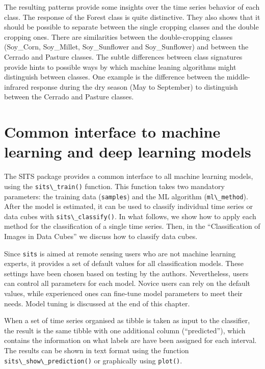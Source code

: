\documentclass[
  11pt,
]{report}
\newcommand{\passthrough}[1]{#1}
\begin{document}
The resulting patterns provide some insights over the time series
behavior of each class. The response of the Forest class is quite
distinctive. They also shows that it should be possible to separate
between the single cropping classes and the double cropping ones. There
are similarities between the double-cropping classes (Soy\_Corn,
Soy\_Millet, Soy\_Sunflower and Soy\_Sunflower) and between the Cerrado
and Pasture classes. The subtle differences between class signatures
provide hints to possible ways by which machine leaning algorithms might
distinguish between classes. One example is the difference between the
middle-infrared response during the dry season (May to September) to
distinguish between the Cerrado and Pasture classes.

\hypertarget{common-interface-to-machine-learning-and-deep-learning-models}{%
\section*{Common interface to machine learning and deep learning
models}\label{common-interface-to-machine-learning-and-deep-learning-models}}

The SITS package provides a common interface to all machine learning
models, using the \passthrough{\lstinline!sits\_train()!} function. This
function takes two mandatory parameters: the training data
(\passthrough{\lstinline!samples!}) and the ML algorithm
(\passthrough{\lstinline!ml\_method!}). After the model is estimated, it
can be used to classify individual time series or data cubes with
\passthrough{\lstinline!sits\_classify()!}. In what follows, we show how
to apply each method for the classification of a single time series.
Then, in the ``Classification of Images in Data Cubes'' we discuss how
to classify data cubes.

Since \passthrough{\lstinline!sits!} is aimed at remote sensing users
who are not machine learning experts, it provides a set of default
values for all classification models. These settings have been chosen
based on testing by the authors. Nevertheless, users can control all
parameters for each model. Novice users can rely on the default values,
while experienced ones can fine-tune model parameters to meet their
needs. Model tuning is discussed at the end of this chapter.

When a set of time series organised as tibble is taken as input to the
classifier, the result is the same tibble with one additional column
(``predicted''), which contains the information on what labels are have
been assigned for each interval. The results can be shown in text format
using the function \passthrough{\lstinline!sits\_show\_prediction()!} or
graphically using \passthrough{\lstinline!plot()!}.
\end{document}
